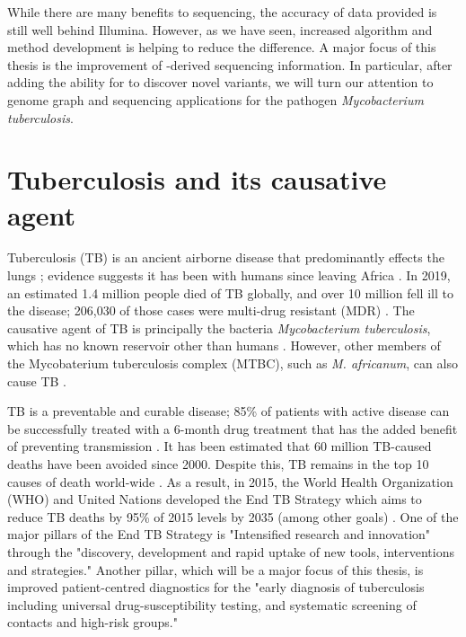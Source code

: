 \hspace{0.75cm}

\noindent
While there are many benefits to \ont{} sequencing, the accuracy of data provided is still well behind Illumina. However, as we have seen, increased algorithm and method development is helping to reduce the difference. A major focus of this thesis is the improvement of \ont{}-derived sequencing information. In particular, after adding the ability for \pandora{} to discover novel variants, we will turn our attention to genome graph and \ont{} sequencing applications for the pathogen \textit{Mycobacterium tuberculosis}.

\section{Tuberculosis and its causative agent}

Tuberculosis (TB) is an ancient airborne disease that predominantly effects the lungs \cite{Pai2016}; evidence suggests it has been with humans since leaving Africa \cite{Wirth2008,Comas2013}. In 2019, an estimated 1.4 million people died of TB globally, and over 10 million fell ill to the disease; 206,030 of those cases were multi-drug resistant (MDR) \cite{who2020}. The causative agent of TB is principally the bacteria \textit{Mycobacterium tuberculosis}, which has no known reservoir other than humans \cite{Comas2013}. However, other members of the Mycobaterium tuberculosis complex (MTBC), such as \textit{M. africanum}, can also cause TB \cite{Pai2016}. 

TB is a preventable and curable disease; 85\% of patients with active disease can be successfully treated with a 6-month drug treatment that has the added benefit of preventing transmission \cite{who2020}. It has been estimated that 60 million TB-caused deaths have been avoided since 2000. Despite this, TB remains in the top 10 causes of death world-wide \cite{who2020}. As a result, in 2015, the World Health Organization (WHO) and United Nations developed the End TB Strategy which aims to reduce TB deaths by 95\% of 2015 levels by 2035 (among other goals) \cite{endtb2020}. One of the major pillars of the End TB Strategy is "Intensified research and innovation" through the "discovery, development and rapid uptake of new tools, interventions and strategies." Another pillar, which will be a major focus of this thesis, is improved patient-centred diagnostics for the "early diagnosis of tuberculosis including universal drug-susceptibility testing, and systematic screening of contacts and high-risk groups."


